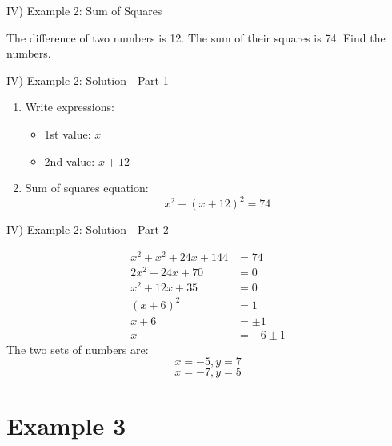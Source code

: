 \documentclass[aspectratio=169]{beamer}
\begin{document}
\begin{frame}{IV) Example 2: Sum of Squares}
    \begin{tcolorbox}[colback=lightgray,colframe=primary,title=Problem]
        \footnotesize
        The difference of two numbers is 12. The sum of their squares is 74. Find the numbers.
    \end{tcolorbox}
\end{frame}

\begin{frame}{IV) Example 2: Solution - Part 1}
    \begin{tcolorbox}[colback=lightgray,colframe=accent,title=Solution - Part 1]
        \footnotesize
        \begin{enumerate}
            \item Write expressions:
            \begin{itemize}
                \item 1st value: $x$
                \item 2nd value: $x + 12$
            \end{itemize}
            \item Sum of squares equation:
            \[x^2 + (x + 12)^2 = 74\]
        \end{enumerate}
    \end{tcolorbox}
\end{frame}

\begin{frame}{IV) Example 2: Solution - Part 2}
    \begin{tcolorbox}[colback=lightgray,colframe=accent,title=Solution - Part 2]
        \footnotesize
        \begin{align*}
            x^2 + x^2 + 24x + 144 &= 74\\
            2x^2 + 24x + 70 &= 0\\
            x^2 + 12x + 35 &= 0\\
            (x + 6)^2 &= 1\\
            x + 6 &= \pm 1\\
            x &= -6 \pm 1
        \end{align*}
        The two sets of numbers are:
        \[x = -5, y = 7\]
        \[x = -7, y = 5\]
    \end{tcolorbox}
\end{frame}

\section{Example 3}
\end{document}
